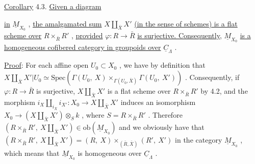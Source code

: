\underline{Corollary} 4.3.  \underline{Given a diagram}

\begin{center}
\end{center}
\underline{in}  $\underline{M}_{X_0}$ , \underline{the amalgamated sum}  $X \underset{\bar{X}}{\amalg} X'$  \underline{(in the sense of schemes) is a flat scheme over}  $R \times_{\bar{R}} R'$ , \underline{provided}  $\varphi : R \to \bar{R}$  \underline{is surjective. Consequently,}  $\underline{M}_{X_0}$ \underline{is a homogeneous cofibered category in groupoids over}  $\underline{C}_\Lambda$ .

\underline{Proof}:  For each affine open  $U_0 \subset X_0$ , we have by definition that $X \underset{\bar{X}}{\amalg} X'|U_0 \simeq \mathrm{Spec}(\Gamma(U_0,\ X) \times_{\Gamma(U_0,\bar{X})} \Gamma(U_0,\ X'))$ . Consequently, if  $\varphi : R \to \bar{R}$ is surjective,  $X \underset{\bar{X}}{\amalg} X'$  is a flat scheme over  $R \times_{\bar{R}} R'$  by 4.2, and the morphism $i_X \underset{i_{\bar{X}}}{\amalg} i_{X'} : X_0 \to X \underset{\bar{X}}{\amalg} X'$  induces an isomorphism  $X_0 \to (X \underset{\bar{X}}{\amalg} X') \otimes_S k$ , where $S = R \times_{\bar{R}} R'$ . Therefore  $(R \times_{\bar{R}} R' ,\ X \underset{\bar{X}}{\amalg} X') \in \mathrm{ob}(\underline{M}_{X_0})$  and we obviously have that  $(R \times_{\bar{R}} R',\ X \underset{\bar{X}}{\amalg} X') = (R,\ X) \times_{(\bar{R},\bar{X})} (R',\ X')$  in the category  $\underline{M}_{X_0}$ , which
means that $\underline{M}_{X_0}$ is homogeneous over $\underline{C}_\Lambda$ .

